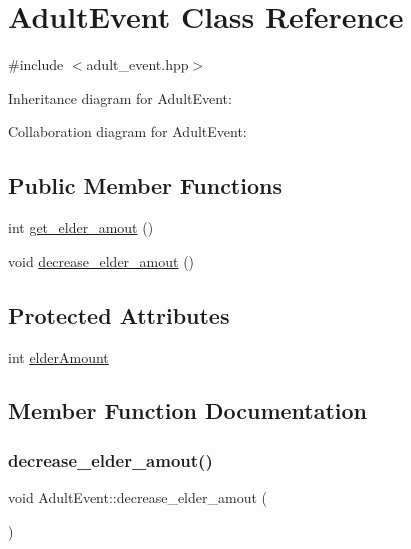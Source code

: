 \hypertarget{class_adult_event}{}\section{Adult\+Event Class Reference}
\label{class_adult_event}


{\ttfamily \#include $<$adult\+\_\+event.\+hpp$>$}



Inheritance diagram for Adult\+Event\+:


Collaboration diagram for Adult\+Event\+:
\subsection*{Public Member Functions}
\begin{DoxyCompactItemize}
\item 
int \hyperlink{class_adult_event_aabbe1a98b685b4e00bb5a258b35e7f2f}{get\+\_\+elder\+\_\+amout} ()
\item 
void \hyperlink{class_adult_event_a4d442f4618a27bcd21ebb460cc77f459}{decrease\+\_\+elder\+\_\+amout} ()
\end{DoxyCompactItemize}
\subsection*{Protected Attributes}
\begin{DoxyCompactItemize}
\item 
int \hyperlink{class_adult_event_a4c3a51c94f97eff72e54530399955aa0}{elder\+Amount}
\end{DoxyCompactItemize}


\subsection{Member Function Documentation}
\mbox{\label{class_adult_event_a4d442f4618a27bcd21ebb460cc77f459}} 
\subsubsection{\texorpdfstring{decrease\+\_\+elder\+\_\+amout()}{decrease\_elder\_amout()}}
{\footnotesize\ttfamily void Adult\+Event\+::decrease\+\_\+elder\+\_\+amout (\begin{DoxyParamCaption}{ }\end{DoxyParamCaption})}

